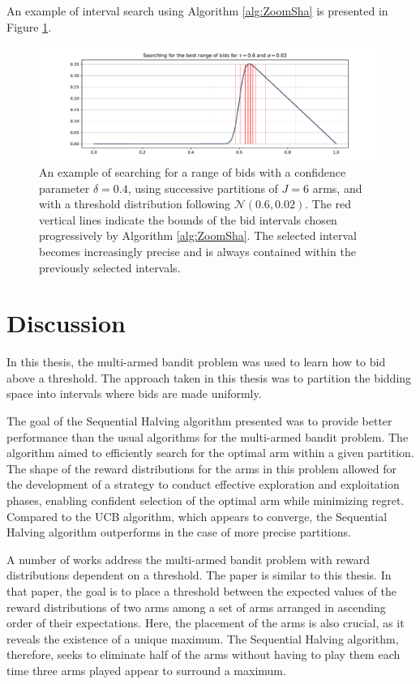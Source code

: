 \documentclass{statsmsc}
\begin{document}
An example of interval search using Algorithm \ref{alg:ZoomSha} is presented in Figure \ref{fig:zoom}.

\begin{figure}[htbp]
  \centering
  \includegraphics[width=0.8 \textwidth]{images/zooming.pdf}
  \caption{An example of searching for a range of bids with a confidence parameter $\delta = 0.4$, using successive partitions of $J=6$ arms, and with a threshold distribution following $\mathcal{N}(0.6, 0.02)$. The red vertical lines indicate the bounds of the bid intervals chosen progressively by Algorithm \ref{alg:ZoomSha}. The selected interval becomes increasingly precise and is always contained within the previously selected intervals.}
  \label{fig:zoom}
\end{figure}

\section{Discussion}

In this thesis, the multi-armed bandit problem was used to learn how to bid above a threshold. The approach taken in this thesis was to partition the bidding space into intervals where bids are made uniformly. 

The goal of the Sequential Halving algorithm presented was to provide better performance 
than the usual algorithms for the multi-armed bandit problem. The algorithm aimed to efficiently search for the optimal arm within a given partition. The shape of the reward distributions 
for the arms in this problem allowed for the development of a strategy to conduct effective exploration and exploitation phases, enabling confident selection of the optimal arm while minimizing regret. Compared to the UCB algorithm, which appears to converge, the Sequential Halving algorithm outperforms in the case of more precise partitions.


A number of works address the multi-armed bandit problem with reward distributions dependent on a threshold. The paper \cite{pmlr-v139-cheshire21a} is similar to this thesis. In that paper, the goal is to place a threshold between the expected values of the reward distributions of two arms among a set of arms arranged in ascending order of their expectations. Here, the placement of the arms 
is also crucial, as it reveals the existence of a unique maximum. The Sequential Halving algorithm, therefore, seeks to eliminate half of the arms without having to play them each time three arms played appear to surround a maximum.
\end{document}
